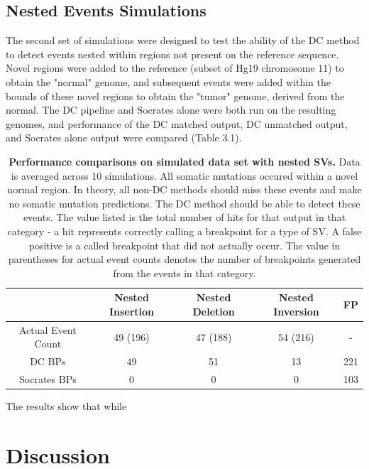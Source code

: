 \documentclass{easychithesis}
\begin{document}
\section{Nested Events Simulations}

The second set of simulations were designed to test the ability of the DC method to detect events nested within regions not present on the reference sequence. Novel regions were added to the reference (subset of Hg19 chromosome 11) to obtain the "normal" genome, and subsequent events were added within the bounds of these novel regions to obtain the "tumor" genome, derived from the normal. The DC pipeline and Socrates alone were both run on the resulting genomes, and performance of the DC matched output, DC unmatched output, and Socrates alone output were compared (Table 3.1).

\begin{table}[h]
\begin{center}
\begin{tabular}{|c|c|c|c|c|}\hline
         & Nested Insertion & Nested Deletion & Nested Inversion & FP \\
        \hline 
        Actual Event Count & 49 (196) & 47 (188) & 54 (216) & -\\
        \hline 
        DC BPs & 49 & 51 & 13 & 221 \\
        \hline
        Socrates BPs & 0 & 0 & 0 & 103 \\
        \hline
\end{tabular}
\caption{{\bf Performance comparisons on simulated data set with nested SVs.} Data is averaged across 10 simulations. All somatic mutations occured within a novel normal region. In theory, all non-DC methods should miss these events and make no somatic mutation predictions. The DC method should be able to detect these events. The value listed is the total number of hits for that output in that category - a hit represents correctly calling a breakpoint for a type of SV. A false positive is a called breakpoint that did not actually occur. The value in parentheses for actual event counts denotes the number of breakpoints generated from the events in that category.}
\end{center}
\end{table}

The results show that while 

\chapter{Discussion}
\end{document}
